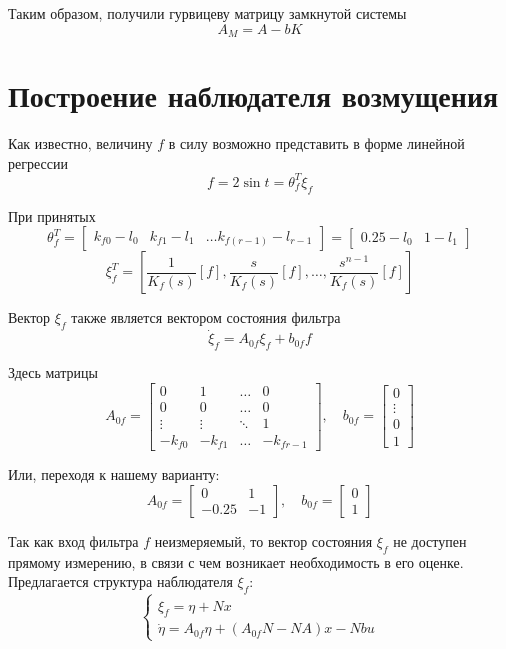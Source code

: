\documentclass[a4paper,hidelinks,14pt]{extarticle}
\begin{document}
	Таким образом, получили гурвицеву матрицу замкнутой системы
	\[
		A_M = A - b K
	\]

	\section{Построение наблюдателя возмущения}
	Как известно, величину $f$ в силу  возможно представить в форме линейной регрессии
	\begin{equation}
		f = 2 \sin t = \theta^T_f \xi_f
	\end{equation}

	При принятых
	\[
		\theta_f^T = \begin{bmatrix}
			k_{f0} - l_0 & k_{f1} - l_1 & \dots k_{f(r-1)} - l_{r-1}
		\end{bmatrix} = \begin{bmatrix}
			0.25 - l_0 & 1 - l_1
		\end{bmatrix}
	\]
	\[
		\xi_f^T = \left[ \frac{1}{K_f(s)}[f], \frac{s}{K_f(s)}[f], \dots, \frac{s^{n-1}}{K_f(s)}[f] \right]
	\]

	Вектор $\xi_f$ также является вектором состояния фильтра
	\begin{equation}
		\dot{\xi}_f = A_{0f} \xi_f + b_{0f} f	
	\end{equation}
	
	Здесь матрицы
	\[
		A_{0f} = \begin{bmatrix} 
			0 & 1 & \dots & 0 \\ 
			0 & 0 & \dots & 0 \\ 
			\vdots & \vdots & \ddots & 1 \\ 
			-k_{f0} & -k_{f1} & \dots & -k_{fr-1} 
			\end{bmatrix}, \quad 
			b_{0f} = \begin{bmatrix} 
			0 \\ \vdots \\ 0 \\ 1 
			\end{bmatrix}
	\]

	Или, переходя к нашему варианту:
	\[
		A_{0f} = \begin{bmatrix}
			0 & 1 \\
			-0.25 & -1
		\end{bmatrix}, \quad b_{0f} = \begin{bmatrix}
			0 \\
			1
		\end{bmatrix}
	\]

	Так как вход фильтра $f$ неизмеряемый, то вектор состояния $\xi_f$ не доступен прямому измерению, в связи с чем возникает необходимость в его оценке. Предлагается структура наблюдателя $\xi_f$:
	\begin{equation}
		\begin{cases*}
			\hat{\xi}_f = \eta + Nx \\
			\dot{\eta} = A_{0f} \eta + (A_{0f} N - NA)x - Nbu	
		\end{cases*}
	\end{equation}
	
\end{document}
